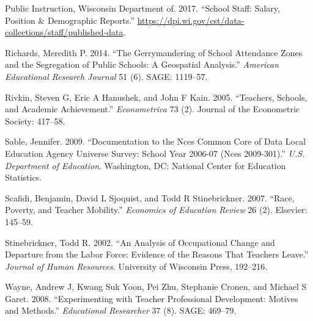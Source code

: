 \documentclass[12pt,]{article}
\begin{document}
\hypertarget{ref-dpi}{}
Public Instruction, Wisconsin Department of. 2017. ``School Staff:
Salary, Position \& Demographic Reports.''
\url{https://dpi.wi.gov/cst/data-collections/staff/published-data}.

\hypertarget{ref-richards}{}
Richards, Meredith P. 2014. ``The Gerrymandering of School Attendance
Zones and the Segregation of Public Schools: A Geospatial Analysis.''
\emph{American Educational Research Journal} 51 (6). SAGE: 1119--57.

\hypertarget{ref-rivkin}{}
Rivkin, Steven G, Eric A Hanushek, and John F Kain. 2005. ``Teachers,
Schools, and Academic Achievement.'' \emph{Econometrica} 73 (2). Journal
of the Econometric Society: 417--58.

\hypertarget{ref-sable}{}
Sable, Jennifer. 2009. ``Documentation to the Nces Common Core of Data
Local Education Agency Universe Survey: School Year 2006-07 (Nces
2009-301).'' \emph{U.S. Department of Education}. Washington, DC:
National Center for Education Statistics.

\hypertarget{ref-scafidi}{}
Scafidi, Benjamin, David L Sjoquist, and Todd R Stinebrickner. 2007.
``Race, Poverty, and Teacher Mobility.'' \emph{Economics of Education
Review} 26 (2). Elsevier: 145--59.

\hypertarget{ref-stinebrickner}{}
Stinebrickner, Todd R. 2002. ``An Analysis of Occupational Change and
Departure from the Labor Force: Evidence of the Reasons That Teachers
Leave.'' \emph{Journal of Human Resources}. University of Wisconsin
Press, 192--216.

\hypertarget{ref-wayne}{}
Wayne, Andrew J, Kwang Suk Yoon, Pei Zhu, Stephanie Cronen, and Michael
S Garet. 2008. ``Experimenting with Teacher Professional Development:
Motives and Methods.'' \emph{Educational Researcher} 37 (8). SAGE:
469--79.
\end{document}
